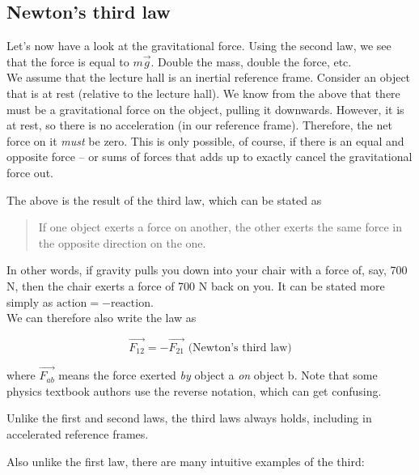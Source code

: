 \subsection{Newton's third law}

Let's now have a look at the gravitational force. Using the second law, we see that the force is equal to $m \vec{g}$. Double the mass, double the force, etc.\\
We assume that the lecture hall is an inertial reference frame. Consider an object that is at rest (relative to the lecture hall). We know from the above that there must be a gravitational force on the object, pulling it downwards. However, it is at rest, so there is no acceleration (in our reference frame). Therefore, the net force on it \emph{must} be zero. This is only possible, of course, if there is an equal and opposite force -- or sums of forces that adds up to exactly cancel the gravitational force out.

The above is the result of the third law, which can be stated as

\begin{quote}
If one object exerts a force on another, the other exerts the same force in the opposite direction on the one.
\end{quote}

In other words, if gravity pulls you down into your chair with a force of, say, 700 N, then the chair exerts a force of 700 N back on you. It can be stated more simply as $\text{action} = -\text{reaction}$.\\
We can therefore also write the law as

\begin{equation}
\vec{F_{12}} = -\vec{F_{21}} \text{ (Newton's third law)} \label{eq:newton3}
\end{equation}

where $\vec{F_{ab}}$ means the force exerted \emph{by} object a \emph{on} object b. Note that some physics textbook authors use the reverse notation, which can get confusing.

Unlike the first and second laws, the third laws always holds, including in accelerated reference frames.

Also unlike the first law, there are many intuitive examples of the third:

